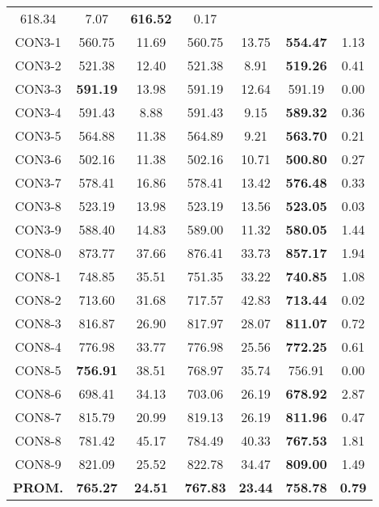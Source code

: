 \begin{table}[ht]
\begin{tabular}{c c c c c c c}
618.34 & 7.07 & \bf{616.52} & 
0.17\\CON3-1 & 560.75 & 11.69 & 
560.75 & 13.75 & \bf{554.47} & 
1.13\\CON3-2 & 521.38 & 12.40 & 
521.38 & 8.91 & \bf{519.26} & 
0.41\\CON3-3 & \bf{591.19} & 13.98 & 
591.19 & 12.64 & 591.19 & 0.00\\
CON3-4 & 591.43 & 8.88 & 
591.43 & 9.15 & \bf{589.32} & 
0.36\\CON3-5 & 564.88 & 11.38 & 
564.89 & 9.21 & \bf{563.70} & 
0.21\\CON3-6 & 502.16 & 11.38 & 
502.16 & 10.71 & \bf{500.80} & 
0.27\\CON3-7 & 578.41 & 16.86 & 
578.41 & 13.42 & \bf{576.48} & 
0.33\\CON3-8 & 523.19 & 13.98 & 
523.19 & 13.56 & \bf{523.05} & 
0.03\\CON3-9 & 588.40 & 14.83 & 
589.00 & 11.32 & \bf{580.05} & 
1.44\\CON8-0 & 873.77 & 37.66 & 
876.41 & 33.73 & \bf{857.17} & 
1.94\\CON8-1 & 748.85 & 35.51 & 
751.35 & 33.22 & \bf{740.85} & 
1.08\\CON8-2 & 713.60 & 31.68 & 
717.57 & 42.83 & \bf{713.44} & 
0.02\\CON8-3 & 816.87 & 26.90 & 
817.97 & 28.07 & \bf{811.07} & 
0.72\\CON8-4 & 776.98 & 33.77 & 
776.98 & 25.56 & \bf{772.25} & 
0.61\\CON8-5 & \bf{756.91} & 38.51 & 
768.97 & 35.74 & 756.91 & 0.00\\
CON8-6 & 698.41 & 34.13 & 
703.06 & 26.19 & \bf{678.92} & 
2.87\\CON8-7 & 815.79 & 20.99 & 
819.13 & 26.19 & \bf{811.96} & 
0.47\\CON8-8 & 781.42 & 45.17 & 
784.49 & 40.33 & \bf{767.53} & 
1.81\\CON8-9 & 821.09 & 25.52 & 
822.78 & 34.47 & \bf{809.00} & 
1.49\\\bf{PROM.} & 
\bf{765.27} & \bf{24.51} & \bf{767.83} & \bf{23.44} & \bf{758.78} & \bf{0.79}\\[1ex]\hline
\end{tabular}
\label{table:nonlin}
\end{table} \clearpage
